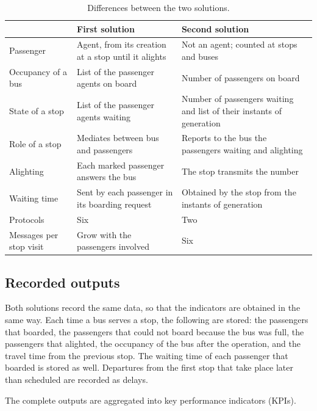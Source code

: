 \documentclass[a4paper,fleqn]{cas-sc}
\begin{document}
\begin{table}[width=\linewidth,cols=3,pos=t]
\caption{Differences between the two solutions.}\label{tbl:differences}
\begin{tabular*}{\tblwidth}{@{}>{\raggedright\arraybackslash}p{.24\linewidth}>{\raggedright\arraybackslash}p{.34\linewidth}>{\raggedright\arraybackslash}p{.34\linewidth}@{}}
\toprule
 & First solution & Second solution \\
\midrule
Passenger & Agent, from its creation at a stop until it alights &
  Not an agent; counted at stops and buses \\
Occupancy of a bus & List of the passenger agents on board &
  Number of passengers on board \\
State of a stop & List of the passenger agents waiting &
  Number of passengers waiting and list of their instants of generation \\
Role of a stop & Mediates between bus and passengers &
  Reports to the bus the passengers waiting and alighting \\
Alighting & Each marked passenger answers the bus &
  The stop transmits the number \\
Waiting time & Sent by each passenger in its boarding request &
  Obtained by the stop from the instants of generation \\
Protocols & Six & Two \\
Messages per stop visit & Grow with the passengers involved & Six \\
\bottomrule
\end{tabular*}
\end{table}
 
\subsection{Recorded outputs}\label{sec:outputs}
 
Both solutions record the same data, so that the indicators are obtained in
the same way. Each time a bus serves a stop, the following are stored: the
passengers that boarded, the passengers that could not board because the bus
was full, the passengers that alighted, the occupancy of the bus after the
operation, and the travel time from the previous stop. The waiting time of
each passenger that boarded is stored as well. Departures from the first stop
that take place later than scheduled are recorded as delays.

The complete outputs are aggregated into key performance indicators (KPIs).
\end{document}
